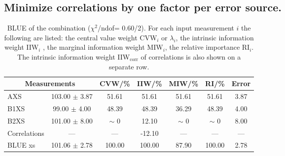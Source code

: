 \subsection{Minimize correlations by one factor per error source.}
\begin{table}[H]
\scriptsize
\begin{center}
\renewcommand{\arraystretch}{1.1}
\begin{tabular}{|lc|c|c|c|c|c|}
\hline
\multicolumn{2}{|c|}{Measurements} & CVW/\%  & IIW/\%  & MIW/\%  & RI/\%  & {\tiny Error}\\
\hline
AXS &     103.00 $\pm$       3.87 &      51.61 &      51.61 &      51.61 &      51.61 &       3.87\\
B1XS &      99.00 $\pm$       4.00 &      48.39 &      48.39 &      36.29 &      48.39 &       4.00\\
B2XS &     101.00 $\pm$       8.00 &  {\tiny $\sim$ }0 &      12.10 &  {\tiny $\sim$ }0 &  {\tiny $\sim$ }0 &       8.00\\
Correlations & --- & --- &     -12.10 & --- & --- & ---\\
\hline
BLUE {\tiny xs} &     101.06 $\pm$       2.78 &     100.00 &     100.00 &      87.90 &     100.00 &       2.78\\
\hline
\end{tabular}
\caption{BLUE of the combination ($\chi^2$/ndof=      0.60/2).
 For each input measurement $i$ the following are listed: the central value weight CVW$_i$ or $\lambda_i$, the intrinsic information weight IIW$_i$ , the marginal information weight MIW$_i$, the relative importance RI$_i$. The intrinsic information weight IIW$_{\mathrm{corr}}$ of correlations is also shown on a separate row.}
\renewcommand{\arraystretch}{1}
\end{center}
\end{table}
